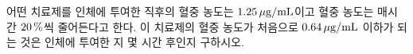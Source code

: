 어떤 치료제를 인체에 투여한 직후의 혈중 농도는 $1.25\mkern3mu \mu\mathrm{g/mL}$이고 혈중 농도는 매시간 $20\mkern3mu \%$씩 줄어든다고 한다. 이 치료제의 혈중 농도가 처음으로 $0.64\mkern3mu \mu\mathrm{g/mL}$ 이하가 되는 것은 인체에 투여한 지 몇 시간 후인지 구하시오.
